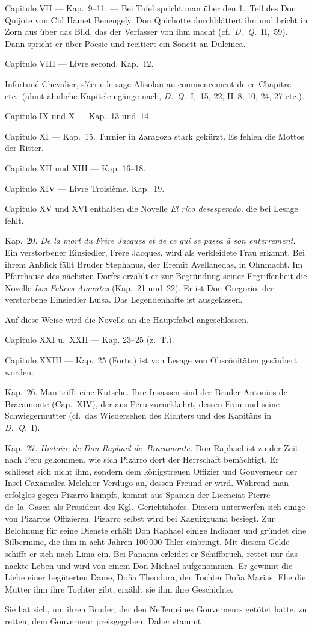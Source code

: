 Capitulo VII --- Kap.~9--11. --- Bei Tafel spricht man über den
1.~Teil des Don Quijote von Cid Hamet Benengely. Don Quichotte
durchblättert ihn und bricht in Zorn aus über das Bild, das der Verfasser
von ihm macht (cf.~{\it D.~Q.}~II,~59). Dann spricht er über Poesie
und recitiert ein Sonett an Dulcinea.

Capitulo VIII --- Livre second. Kap.~12.

{\itquoted\french Infortuné Chevalier, s'écrie le sage Alisolan au commencement
de ce Chapitre} etc.\ (ahmt ähnliche Kapiteleingänge nach, {\it D.~Q.}~I,~15,
22, II~8, 10, 24, 27 etc.).

Capitulo IX und X --- Kap.~13 und~14.

Capitulo XI --- Kap.~15. Turnier in Zaragoza stark gekürzt. Es
fehlen die Mottos der Ritter.

Capitulo XII und XIII --- Kap. 16--18.

Capitulo XIV --- Livre Troisième. Kap.~19.

Capitulo XV und XVI enthalten die Novelle {\it\spanish El rico desesperado,}
die bei Lesage fehlt.

\longdash Kap.~20. {\it\french De la mort du Frère Jacques et de ce qui se
passa à son enterrement.} Ein verstorbener Einsiedler, Frère Jacques,
wird als verkleidete Frau erkannt. Bei ihrem Anblick fällt Bruder
Stephanus, der Eremit Avellanedas, in Ohnmacht. Im Pfarrhause des
nächsten Dorfes erzählt er zur Begründung seiner Ergriffenheit die
Novelle {\it Los Felices Amantes} (Kap.~21 und~22). Er ist Don Gregorio,
der verstorbene Einsiedler Luisa. Das Legendenhafte ist ausgelassen.

Auf diese Weise wird die Novelle an die Hauptfabel angeschlossen.

Capitulo XXI u.\ XXII --- Kap. 23--25 (z.~T.).

Capitulo XXIII --- Kap.~25 (Forts.) ist von Lesage von Obscönitäten
gesäubert worden.

\longdash Kap.~26. Man trifft eine Kutsche. Ihre Insassen sind der
Bruder Antonios de Bracamonte (Cap.~XIV), der aus Peru zurückkehrt,
dessen Frau und seine Schwiegermutter (cf.\ das Wiedersehen des Richters
und des Kapitäns in {\it D.~Q.}~I).

\longdash Kap.~27. {\it Histoire de Don Raphaël de~Bracamonte.} Don
Raphael ist zu der Zeit nach Peru gekommen, wie sich Pizarro dort der
Herrschaft bemächtigt. Er schliesst sich nicht ihm, sondern dem
königstreuen Offizier und Gouverneur der Insel Caxamalca Melchior Verdugo
an, dessen Freund er wird. Während man erfolglos gegen Pizarro kämpft,
kommt aus Spanien der Licenciat Pierre de~la~Gasca als Präsident des
Kgl.~Gerichtshofes. Diesem unterwerfen sich einige von Pizarros Offizieren.
Pizarro selbst wird bei Xaguixguana besiegt. Zur Belohnung
für seine Dienste erhält Don Raphael einige Indianer und gründet eine
Silbermine, die ihm in acht Jahren 100\,000 Taler einbringt. Mit diesem
Gelde schifft er sich nach Lima ein. Bei Panama erleidet er Schiffbruch,
rettet nur das nackte Leben und wird von einem Don Michael aufgenommen.
Er gewinnt die Liebe einer begüterten Dame, Doña Theodora,
der Tochter Doña Marias. Ehe die Mutter ihm ihre Tochter gibt,
erzählt sie ihm ihre Geschichte.

Sie hat sich, um ihren Bruder, der den Neffen eines Gouverneurs
getötet hatte, zu retten, dem Gouverneur preisgegeben. Daher stammt
